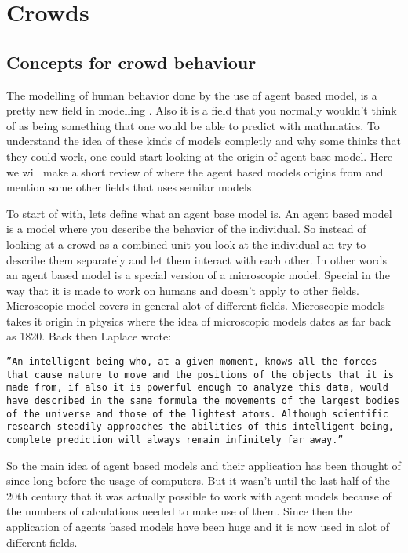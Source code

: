 \section{Crowds}
\subsection{Concepts for crowd behaviour}
The modelling of human behavior done by the use of agent based model, is a pretty 
new field in modelling \cite{helbing00}. Also it is a field that you normally wouldn't 
think of as being something that one would be able to predict with mathmatics. To understand 
the idea of these kinds of models completly and why some thinks that they could work, one could 
start looking at the origin of agent base model. Here we will make a short review of where 
the agent based models origins from and mention some other fields that uses semilar models. 

To start of with, lets define what an agent base model is. An agent based model is a model 
where you describe the behavior of the individual. So instead of looking at a crowd as a combined 
unit you look at the individual an try to describe them separately and let them interact with 
each other. In other words an agent based model is a special version of a microscopic model. 
Special in the way that it is made to work on humans and doesn't apply to other fields. Microscopic 
model covers in general alot of different fields. Microscopic models takes it origin in physics where 
the idea of microscopic models dates as far back as 1820. Back then Laplace wrote\cite{simintro}:

\begin{center}
\begin{minipage}[c]{5in}
\texttt{''An intelligent being who, at a given moment,
knows all the forces that cause nature to move and
the positions of the objects that it is made from, if
also it is powerful enough to analyze this data, would
have described in the same formula the movements of
the largest bodies of the universe and those of the
lightest atoms. Although scientific research steadily
approaches the abilities of this intelligent being, complete
prediction will always remain infinitely far away.''}
\end{minipage}
\end{center}

So the main idea of agent based models and their application has been thought of since long before 
the usage of computers. But it wasn't until the last half of the 20th century that it was actually 
possible to work with agent models because of the numbers of calculations needed to make use of them\cite{simintro}. 
Since then the application of agents based models have been huge and it is now used in alot of different fields. 

